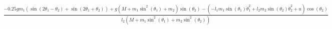 \documentclass[preview]{standalone}
\begin{document}
\begin{align*}
\frac{- 0.25 g m_{1} \left(\operatorname{sin}\left(2 \theta_{1} - \theta_{2}\right) + \operatorname{sin}\left(2 \theta_{1} + \theta_{2}\right)\right) + g \left(M + m_{1} \operatorname{sin}^{2}\left(\theta_{1}\right) + m_{2}\right) \operatorname{sin}\left(\theta_{2}\right) - \left(- l_{1} m_{1} \operatorname{sin}\left(\theta_{1}\right) \dot{\theta}_{1}^{2} + l_{2} m_{2} \operatorname{sin}\left(\theta_{2}\right) \dot{\theta}_{2}^{2} + u\right) \operatorname{cos}\left(\theta_{2}\right)}{l_{2} \left(M + m_{1} \operatorname{sin}^{2}\left(\theta_{1}\right) + m_{2} \operatorname{sin}^{2}\left(\theta_{2}\right)\right)}
\end{align*}
\end{document}
